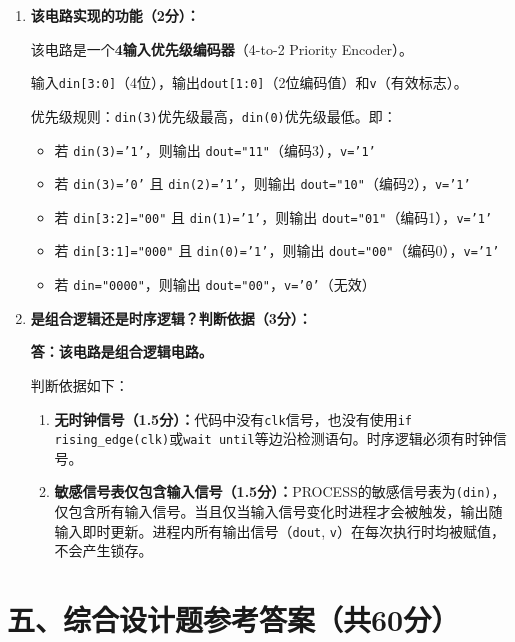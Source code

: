 \begin{enumerate}[label=(\arabic*)]

\item \textbf{该电路实现的功能（2分）：}

该电路是一个\textbf{4输入优先级编码器}（4-to-2 Priority Encoder）。

输入\texttt{din[3:0]}（4位），输出\texttt{dout[1:0]}（2位编码值）和\texttt{v}（有效标志）。

优先级规则：\texttt{din(3)}优先级最高，\texttt{din(0)}优先级最低。即：
\begin{itemize}
  \item 若 \texttt{din(3)='1'}，则输出 \texttt{dout="11"}（编码3），\texttt{v='1'}
  \item 若 \texttt{din(3)='0'} 且 \texttt{din(2)='1'}，则输出 \texttt{dout="10"}（编码2），\texttt{v='1'}
  \item 若 \texttt{din[3:2]="00"} 且 \texttt{din(1)='1'}，则输出 \texttt{dout="01"}（编码1），\texttt{v='1'}
  \item 若 \texttt{din[3:1]="000"} 且 \texttt{din(0)='1'}，则输出 \texttt{dout="00"}（编码0），\texttt{v='1'}
  \item 若 \texttt{din="0000"}，则输出 \texttt{dout="00"}，\texttt{v='0'}（无效）
\end{itemize}

\item \textbf{是组合逻辑还是时序逻辑？判断依据（3分）：}

\textbf{答：该电路是组合逻辑电路。}

判断依据如下：
\begin{enumerate}
  \item \textbf{无时钟信号（1.5分）：}代码中没有\texttt{clk}信号，也没有使用\texttt{if rising\_edge(clk)}或\texttt{wait until}等边沿检测语句。时序逻辑必须有时钟信号。
  \item \textbf{敏感信号表仅包含输入信号（1.5分）：}PROCESS的敏感信号表为\texttt{(din)}，仅包含所有输入信号。当且仅当输入信号变化时进程才会被触发，输出随输入即时更新。进程内所有输出信号（\texttt{dout}, \texttt{v}）在每次执行时均被赋值，不会产生锁存。
\end{enumerate}

\end{enumerate}

\section*{五、综合设计题参考答案（共60分）}

